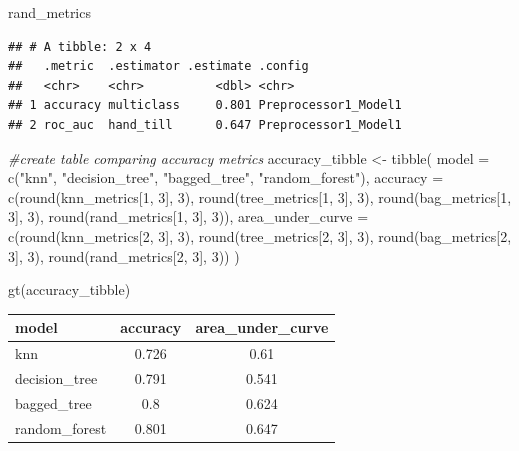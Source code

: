 \documentclass[
]{article}
\newenvironment{Shaded}{\begin{snugshade}}{\end{snugshade}}
\newcommand{\AttributeTok}[1]{\textcolor[rgb]{0.77,0.63,0.00}{#1}}
\newcommand{\CommentTok}[1]{\textcolor[rgb]{0.56,0.35,0.01}{\textit{#1}}}
\newcommand{\DecValTok}[1]{\textcolor[rgb]{0.00,0.00,0.81}{#1}}
\newcommand{\FunctionTok}[1]{\textcolor[rgb]{0.00,0.00,0.00}{#1}}
\newcommand{\NormalTok}[1]{#1}
\newcommand{\OtherTok}[1]{\textcolor[rgb]{0.56,0.35,0.01}{#1}}
\newcommand{\StringTok}[1]{\textcolor[rgb]{0.31,0.60,0.02}{#1}}
\begin{document}
\begin{Shaded}
\begin{Highlighting}[]
\NormalTok{rand\_metrics}
\end{Highlighting}
\end{Shaded}

\begin{verbatim}
## # A tibble: 2 x 4
##   .metric  .estimator .estimate .config             
##   <chr>    <chr>          <dbl> <chr>               
## 1 accuracy multiclass     0.801 Preprocessor1_Model1
## 2 roc_auc  hand_till      0.647 Preprocessor1_Model1
\end{verbatim}

\begin{Shaded}
\begin{Highlighting}[]
\CommentTok{\#create table comparing accuracy metrics}
\NormalTok{accuracy\_tibble }\OtherTok{\textless{}{-}} \FunctionTok{tibble}\NormalTok{(}
  \AttributeTok{model =} \FunctionTok{c}\NormalTok{(}\StringTok{"knn"}\NormalTok{, }\StringTok{"decision\_tree"}\NormalTok{, }\StringTok{"bagged\_tree"}\NormalTok{, }\StringTok{"random\_forest"}\NormalTok{),}
  \AttributeTok{accuracy =} \FunctionTok{c}\NormalTok{(}\FunctionTok{round}\NormalTok{(knn\_metrics[}\DecValTok{1}\NormalTok{, }\DecValTok{3}\NormalTok{], }\DecValTok{3}\NormalTok{), }\FunctionTok{round}\NormalTok{(tree\_metrics[}\DecValTok{1}\NormalTok{, }\DecValTok{3}\NormalTok{], }\DecValTok{3}\NormalTok{), }\FunctionTok{round}\NormalTok{(bag\_metrics[}\DecValTok{1}\NormalTok{, }\DecValTok{3}\NormalTok{], }\DecValTok{3}\NormalTok{), }\FunctionTok{round}\NormalTok{(rand\_metrics[}\DecValTok{1}\NormalTok{, }\DecValTok{3}\NormalTok{], }\DecValTok{3}\NormalTok{)),}
  \AttributeTok{area\_under\_curve =} \FunctionTok{c}\NormalTok{(}\FunctionTok{round}\NormalTok{(knn\_metrics[}\DecValTok{2}\NormalTok{, }\DecValTok{3}\NormalTok{], }\DecValTok{3}\NormalTok{), }\FunctionTok{round}\NormalTok{(tree\_metrics[}\DecValTok{2}\NormalTok{, }\DecValTok{3}\NormalTok{], }\DecValTok{3}\NormalTok{), }\FunctionTok{round}\NormalTok{(bag\_metrics[}\DecValTok{2}\NormalTok{, }\DecValTok{3}\NormalTok{], }\DecValTok{3}\NormalTok{), }\FunctionTok{round}\NormalTok{(rand\_metrics[}\DecValTok{2}\NormalTok{, }\DecValTok{3}\NormalTok{], }\DecValTok{3}\NormalTok{))}
\NormalTok{)}

\FunctionTok{gt}\NormalTok{(accuracy\_tibble)}
\end{Highlighting}
\end{Shaded}

\begin{longtable}{lcc}
\toprule
model & accuracy & area\_under\_curve \\ 
\midrule
knn & 0.726 & 0.61 \\ 
decision\_tree & 0.791 & 0.541 \\ 
bagged\_tree & 0.8 & 0.624 \\ 
random\_forest & 0.801 & 0.647 \\ 
\bottomrule
\end{longtable}
\end{document}
